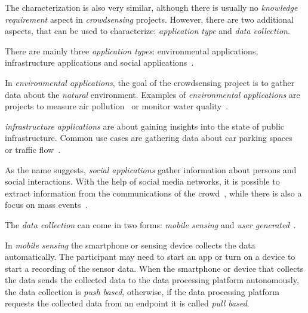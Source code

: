 The characterization is also very similar, although there is usually no \textit{knowledge requirement} aspect in \textit{crowdsensing} projects.
However, there are two additional aspects, that can be used to characterize: \textit{application type} and \textit{data collection}.

There are mainly three \textit{application types}: environmental applications, infrastructure applications and social applications~\cite{ganti2011mobile}.

In \textit{environmental applications}, the goal of the crowdsensing project is to gather data about the \textit{natural} environment.
Examples of \textit{environmental applications} are projects to measure air pollution~\cite{hasenfratz2012participatory,sivaraman2013hazewatch,liu2018third} or monitor water quality~\cite{minkman2015citizen,rapousis2016performance,shang2023crowdwatersens}.

\textit{infrastructure applications} are about gaining insights into the state of public infrastructure.
Common use cases are gathering data about car parking spaces~\cite{villanueva2015crowdsensing,coric2013crowdsensing,rinne2014mobile} or traffic flow~\cite{wang2018city,li2019privacy,mei2020towards}.

As the name suggests, \textit{social applications} gather information about persons and social interactions.
With the help of social media networks, it is possible to extract information from the communications of the crowd~\cite{grasso2017public,cecilia2020mobile,phan2019drinks}, while there is also a focus on mass events~\cite{rahman2017location,cardone2014crowdsensing,jarvis2013ubicomp}.

The \textit{data collection} can come in two forms: \textit{mobile sensing} and \textit{user generated}~\cite{pietschmann2008croco}.

In \textit{mobile sensing} the smartphone or sensing device collects the data automatically.
The participant may need to start an app or turn on a device to start a recording of the sensor data.
When the smartphone or device that collects the data sends the collected data to the data processing platform autonomously, the data collection is \textit{push based}, otherwise, if the data processing platform requests the collected data from an endpoint it is called \textit{pull based}. 

